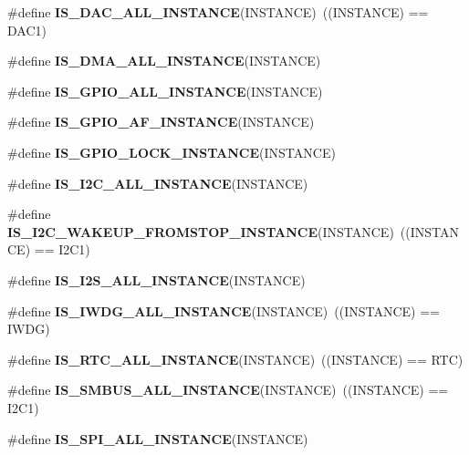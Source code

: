 \begin{DoxyCompactItemize}
\#define {\bfseries I\+S\+\_\+\+D\+A\+C\+\_\+\+A\+L\+L\+\_\+\+I\+N\+S\+T\+A\+N\+CE}(I\+N\+S\+T\+A\+N\+CE)~((I\+N\+S\+T\+A\+N\+CE) == D\+A\+C1)
\item 
\#define {\bfseries I\+S\+\_\+\+D\+M\+A\+\_\+\+A\+L\+L\+\_\+\+I\+N\+S\+T\+A\+N\+CE}(I\+N\+S\+T\+A\+N\+CE)
\item 
\#define {\bfseries I\+S\+\_\+\+G\+P\+I\+O\+\_\+\+A\+L\+L\+\_\+\+I\+N\+S\+T\+A\+N\+CE}(I\+N\+S\+T\+A\+N\+CE)
\item 
\#define {\bfseries I\+S\+\_\+\+G\+P\+I\+O\+\_\+\+A\+F\+\_\+\+I\+N\+S\+T\+A\+N\+CE}(I\+N\+S\+T\+A\+N\+CE)
\item 
\#define {\bfseries I\+S\+\_\+\+G\+P\+I\+O\+\_\+\+L\+O\+C\+K\+\_\+\+I\+N\+S\+T\+A\+N\+CE}(I\+N\+S\+T\+A\+N\+CE)
\item 
\#define {\bfseries I\+S\+\_\+\+I2\+C\+\_\+\+A\+L\+L\+\_\+\+I\+N\+S\+T\+A\+N\+CE}(I\+N\+S\+T\+A\+N\+CE)
\item 
\mbox{\label{group___exported__macro_gadf692bda16bac3264bccff7f59ddaab9}} 
\#define {\bfseries I\+S\+\_\+\+I2\+C\+\_\+\+W\+A\+K\+E\+U\+P\+\_\+\+F\+R\+O\+M\+S\+T\+O\+P\+\_\+\+I\+N\+S\+T\+A\+N\+CE}(I\+N\+S\+T\+A\+N\+CE)~((I\+N\+S\+T\+A\+N\+CE) == I2\+C1)
\item 
\#define {\bfseries I\+S\+\_\+\+I2\+S\+\_\+\+A\+L\+L\+\_\+\+I\+N\+S\+T\+A\+N\+CE}(I\+N\+S\+T\+A\+N\+CE)
\item 
\mbox{\label{group___exported__macro_gad9ec4c52f0572ee67d043e006f1d5e39}} 
\#define {\bfseries I\+S\+\_\+\+I\+W\+D\+G\+\_\+\+A\+L\+L\+\_\+\+I\+N\+S\+T\+A\+N\+CE}(I\+N\+S\+T\+A\+N\+CE)~((I\+N\+S\+T\+A\+N\+CE) == I\+W\+DG)
\item 
\mbox{\label{group___exported__macro_gab4230e8bd4d88adc4250f041d67375ce}} 
\#define {\bfseries I\+S\+\_\+\+R\+T\+C\+\_\+\+A\+L\+L\+\_\+\+I\+N\+S\+T\+A\+N\+CE}(I\+N\+S\+T\+A\+N\+CE)~((I\+N\+S\+T\+A\+N\+CE) == R\+TC)
\item 
\mbox{\label{group___exported__macro_gaf492fcfe71eab8d1dadf4d837b840af6}} 
\#define {\bfseries I\+S\+\_\+\+S\+M\+B\+U\+S\+\_\+\+A\+L\+L\+\_\+\+I\+N\+S\+T\+A\+N\+CE}(I\+N\+S\+T\+A\+N\+CE)~((I\+N\+S\+T\+A\+N\+CE) == I2\+C1)
\item 
\#define {\bfseries I\+S\+\_\+\+S\+P\+I\+\_\+\+A\+L\+L\+\_\+\+I\+N\+S\+T\+A\+N\+CE}(I\+N\+S\+T\+A\+N\+CE)

\end{DoxyCompactItemize}
